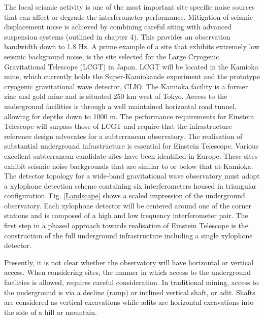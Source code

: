 The local seismic activity is one of the most important site specific noise sources that can affect or degrade the interferometer performance. Mitigation of seismic displacement noise is achieved by combining careful siting with advanced suspension systems (outlined in chapter 4). This provides an observation bandwidth down to 1.8 Hz. A prime example of a site that exhibits extremely low seismic background noise, is the site selected for the Large Cryogenic Gravitational Telescope (LCGT) in Japan. LCGT will be located in the Kamioka mine, which currently holds the Super-Kamiokande experiment and the prototype cryogenic gravitational wave detector, CLIO. The Kamioka facility is a former zinc and gold mine and is situated 250 km west of Tokyo. Access to the underground facilities is through a well maintained horizontal road tunnel, allowing for depths down to 1000 m. The performance requirements for Einstein Telescope will surpass those of LCGT and require that the infrastructure reference design advocates for a subterranean observatory. The realisation of substantial underground infrastructure is essential for Einstein Telescope. Various excellent subterranean candidate sites have been identified in Europe. These sites exhibit seismic noise backgrounds that are similar to or below that at Kamioka.\\

The detector topology for a wide-band gravitational wave observatory must adopt a xylophone detection scheme containing six interferometers housed in triangular configuration. Fig. \ref{Landscape} shows a scaled impression of the underground observatory. Each xylophone detector will be centered around one of the corner stations and is composed of a high and low frequency interferometer pair. The first step in a phased approach towards realisation of Einstein Telescope is the construction of the full underground infrastructure including a single xylophone detector. 

Presently, it is not clear whether the observatory will have horizontal or vertical access. When considering sites, the manner in which access to the underground facilities is allowed, requires careful consideration. In traditional mining, access to the underground is via a decline (ramp) or inclined vertical shaft, or adit. Shafts are considered as vertical excavations while adits are horizontal excavations into the side of a hill or mountain. 

